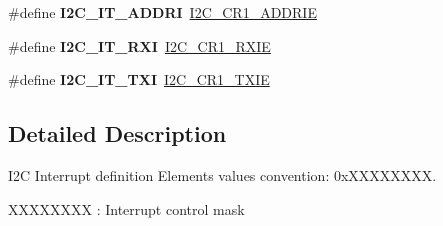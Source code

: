 \begin{DoxyCompactItemize}
\item 
\mbox{\label{group___i2_c___interrupt__configuration__definition_ga2a4058126bd3d7ea36eedfbc0f0d926d}} 
\#define {\bfseries I2\+C\+\_\+\+I\+T\+\_\+\+A\+D\+D\+RI}~\mbox{\hyperlink{group___peripheral___registers___bits___definition_ga275e85befdb3d7ea7b5eb402cec574ec}{I2\+C\+\_\+\+C\+R1\+\_\+\+A\+D\+D\+R\+IE}}
\item 
\mbox{\label{group___i2_c___interrupt__configuration__definition_ga37af8a13ac5afcbd22cec22f471543ce}} 
\#define {\bfseries I2\+C\+\_\+\+I\+T\+\_\+\+R\+XI}~\mbox{\hyperlink{group___peripheral___registers___bits___definition_gaf1fc89bf142bfc08ee78763e6e27cd80}{I2\+C\+\_\+\+C\+R1\+\_\+\+R\+X\+IE}}
\item 
\mbox{\label{group___i2_c___interrupt__configuration__definition_gae0ed342e48cfd545190da23791980c35}} 
\#define {\bfseries I2\+C\+\_\+\+I\+T\+\_\+\+T\+XI}~\mbox{\hyperlink{group___peripheral___registers___bits___definition_ga8bd36da8f72bc91040e63af07dd6b5a4}{I2\+C\+\_\+\+C\+R1\+\_\+\+T\+X\+IE}}
\end{DoxyCompactItemize}


\subsection{Detailed Description}
I2C Interrupt definition Elements values convention\+: 0x\+X\+X\+X\+X\+X\+X\+XX. 


\begin{DoxyItemize}
\item X\+X\+X\+X\+X\+X\+XX \+: Interrupt control mask 
\end{DoxyItemize}